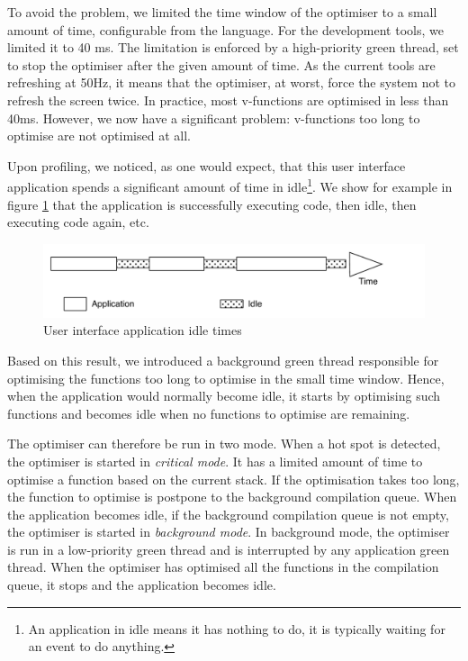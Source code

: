 \documentclass[a4paper,12pt,twoside]{../includes/ThesisStyle}
\begin{document}
To avoid the problem, we limited the time window of the optimiser to a small amount of time, configurable from the language. For the development tools, we limited it to 40 ms. The limitation is enforced by a high-priority green thread, set to stop the optimiser after the given amount of time. As the current tools are refreshing at 50Hz, it means that the optimiser, at worst, force the system not to refresh the screen twice. In practice, most v-functions are optimised in less than 40ms. However, we now have a significant problem: v-functions too long to optimise are not optimised at all.

Upon profiling, we noticed, as one would expect, that this user interface application spends a significant amount of time in idle\footnote{An application in idle means it has nothing to do, it is typically waiting for an event to do anything.}. We show for example in figure \ref{fig:ApplicationIdle} that the application is successfully executing code, then idle, then executing code again, etc. 

\begin{figure}[h!]
    \begin{center}
        \includegraphics[width=0.9\linewidth]{ApplicationIdle}
        \caption{User interface application idle times}
        \label{fig:ApplicationIdle}
    \end{center}
\end{figure}

Based on this result, we introduced a background green thread responsible for optimising the functions too long to optimise in the small time window. Hence, when the application would normally become idle, it starts by optimising such functions and becomes idle when no functions to optimise are remaining.

The optimiser can therefore be run in two mode. When a hot spot is detected, the optimiser is started in \emph{critical mode}. It has a limited amount of time to optimise a function based on the current stack. If the optimisation takes too long, the function to optimise is postpone to the background compilation queue. When the application becomes idle, if the background compilation queue is not empty, the optimiser is started in \emph{background mode}. In background mode, the optimiser is run in a low-priority green thread and is interrupted by any application green thread. When the optimiser has optimised all the functions in the compilation queue, it stops and the application becomes idle.
\end{document}
